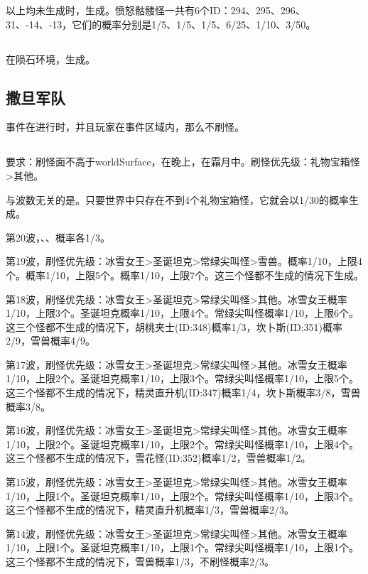 以上均未生成时，生成。愤怒骷髅怪一共有6个ID：294、295、296、31、-14、-13，它们的概率分别是1/5、1/5、1/5、6/25、1/10、3/50。

\subsection{}
在陨石环境，生成。

\subsection{撒旦军队}
事件在进行时，并且玩家在事件区域内，那么不刷怪。

\subsection{}
要求：刷怪面不高于worldSurface，在晚上，在霜月中。刷怪优先级：礼物宝箱怪>其他。

与波数无关的是。只要世界中只存在不到4个礼物宝箱怪，它就会以1/30的概率生成。

第20波，、、概率各1/3。

第19波，刷怪优先级：冰雪女王>圣诞坦克>常绿尖叫怪>雪兽。概率1/10，上限4个。概率1/10，上限5个。概率1/10，上限7个。这三个怪都不生成的情况下生成。

第18波，刷怪优先级：冰雪女王>圣诞坦克>常绿尖叫怪>其他。冰雪女王概率1/10，上限3个。圣诞坦克概率1/10，上限4个。常绿尖叫怪概率1/10，上限6个。这三个怪都不生成的情况下，胡桃夹士(ID:348)概率1/3，坎卜斯(ID:351)概率2/9，雪兽概率4/9。

第17波，刷怪优先级：冰雪女王>圣诞坦克>常绿尖叫怪>其他。冰雪女王概率1/10，上限2个。圣诞坦克概率1/10，上限3个。常绿尖叫怪概率1/10，上限5个。这三个怪都不生成的情况下，精灵直升机(ID:347)概率1/4，坎卜斯概率3/8，雪兽概率3/8。

第16波，刷怪优先级：冰雪女王>圣诞坦克>常绿尖叫怪>其他。冰雪女王概率1/10，上限2个。圣诞坦克概率1/10，上限2个。常绿尖叫怪概率1/10，上限4个。这三个怪都不生成的情况下，雪花怪(ID:352)概率1/2，雪兽概率1/2。

第15波，刷怪优先级：冰雪女王>圣诞坦克>常绿尖叫怪>其他。冰雪女王概率1/10，上限1个。圣诞坦克概率1/10，上限2个。常绿尖叫怪概率1/10，上限3个。这三个怪都不生成的情况下，精灵直升机概率1/3，雪兽概率2/3。

第14波，刷怪优先级：冰雪女王>圣诞坦克>常绿尖叫怪>其他。冰雪女王概率1/10，上限1个。圣诞坦克概率1/10，上限1个。常绿尖叫怪概率1/10，上限1个。这三个怪都不生成的情况下，雪兽概率1/3，不刷怪概率2/3。

